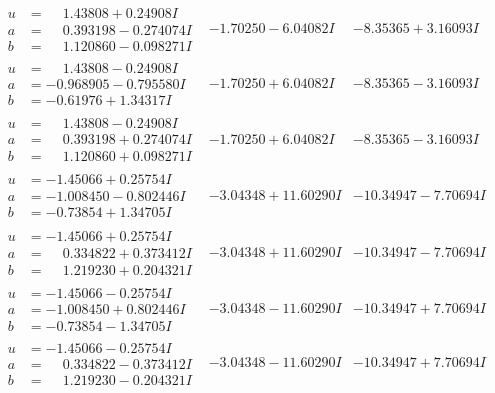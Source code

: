 \documentclass[1p]{elsarticle_modified}
\theoremstyle{definition}
\begin{document}
$$\begin{array}{c|c|c}
\begin{aligned}
u &= \phantom{-}1.43808 + 0.24908 I \\
a &= \phantom{-}0.393198 - 0.274074 I \\
b &= \phantom{-}1.120860 - 0.098271 I\end{aligned}
 & -1.70250 - 6.04082 I & -8.35365 + 3.16093 I \\ \hline\begin{aligned}
u &= \phantom{-}1.43808 - 0.24908 I \\
a &= -0.968905 - 0.795580 I \\
b &= -0.61976 + 1.34317 I\end{aligned}
 & -1.70250 + 6.04082 I & -8.35365 - 3.16093 I \\ \hline\begin{aligned}
u &= \phantom{-}1.43808 - 0.24908 I \\
a &= \phantom{-}0.393198 + 0.274074 I \\
b &= \phantom{-}1.120860 + 0.098271 I\end{aligned}
 & -1.70250 + 6.04082 I & -8.35365 - 3.16093 I \\ \hline\begin{aligned}
u &= -1.45066 + 0.25754 I \\
a &= -1.008450 - 0.802446 I \\
b &= -0.73854 + 1.34705 I\end{aligned}
 & -3.04348 + 11.60290 I & -10.34947 - 7.70694 I \\ \hline\begin{aligned}
u &= -1.45066 + 0.25754 I \\
a &= \phantom{-}0.334822 + 0.373412 I \\
b &= \phantom{-}1.219230 + 0.204321 I\end{aligned}
 & -3.04348 + 11.60290 I & -10.34947 - 7.70694 I \\ \hline\begin{aligned}
u &= -1.45066 - 0.25754 I \\
a &= -1.008450 + 0.802446 I \\
b &= -0.73854 - 1.34705 I\end{aligned}
 & -3.04348 - 11.60290 I & -10.34947 + 7.70694 I \\ \hline\begin{aligned}
u &= -1.45066 - 0.25754 I \\
a &= \phantom{-}0.334822 - 0.373412 I \\
b &= \phantom{-}1.219230 - 0.204321 I\end{aligned}
 & -3.04348 - 11.60290 I & -10.34947 + 7.70694 I\\

\end{array}$$
\end{document}
